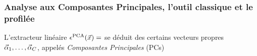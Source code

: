 \subsubsection{Analyse aux Composantes Principales, l'outil classique et le profilée}
L'extracteur linéaire $\epsilon^{\mathrm{PCA}}(\vec{x}) = $ se déduit des certains vecteurs propres $\vec{\alpha}_1, \dots, \vec{\alpha}_C$, appelés \emph{Composantes Principales} (PCs) 
%
%
